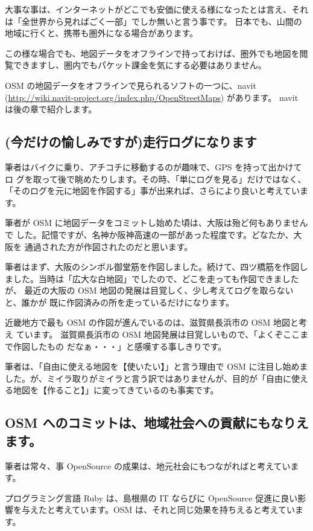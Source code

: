 \documentclass[mingoth,a4paper]{jsarticle}
\begin{document}
大事な事は、インターネットがどこでも安価に使える様になったとは言え、それ
は「全世界から見ればごく一部」でしか無いと言う事です。
日本でも、山間の地域に行くと、携帯も圏外になる場合があります。

この様な場合でも、地図データをオフラインで持っておけば、圏外でも地図を閲
覧できますし、圏内でもパケット課金を気にする必要はありません。

OSM の地図データをオフラインで見られるソフトの一つに、navit
(\url{http://wiki.navit-project.org/index.php/OpenStreetMaps}) があります。
navit は後の章で紹介します。

\subsection{(今だけの愉しみですが)走行ログになります}

筆者はバイクに乗り、アチコチに移動するのが趣味で、GPS を持って出かけてロ
グを取って後で眺めたりします。その時、「単にログを見る」だけではなく、
「そのログを元に地図を作図する」事が出来れば、さらにより良いと考えていま
す。

筆者が OSM に地図データをコミットし始めた頃は、大阪は殆ど何もありませんで
した。記憶ですが、名神か阪神高速の一部があった程度です。どなたか、大阪を
通過された方が作図されたのだと思います。

筆者はまず、大阪のシンボル御堂筋を作図しました。続けて、四ツ橋筋を作図し
ました。当時は「広大な白地図」でしたので、どこを走っても作図できましたが、
最近の大阪の OSM 地図の発展は目覚しく、少し考えてログを取らないと、誰かが
既に作図済みの所を走っているだけになります。

近畿地方で最も OSM の作図が進んでいるのは、滋賀県長浜市の OSM 地図と考え
ています。
滋賀県長浜市の OSM 地図発展は目覚しいもので、「よくぞここまで作図したもの
だなぁ・・・」と感嘆する事しきりです。

筆者は、「自由に使える地図を【使いたい】」と言う理由で OSM に注目し始めま
した。が、ミイラ取りがミイラと言う訳ではありませんが、目的が「自由に使え
る地図を【作ること】」に変ってきているのも事実です。

\subsection{OSM へのコミットは、地域社会への貢献にもなりえます。}

筆者は常々、事 OpenSource の成果は、地元社会にもつながればと考えています。

プログラミング言語 Ruby は、島根県の IT ならびに OpenSource 促進に良い影
響を与えたと考えています。OSM は、それと同じ効果を持ちえると考えています。
\end{document}
